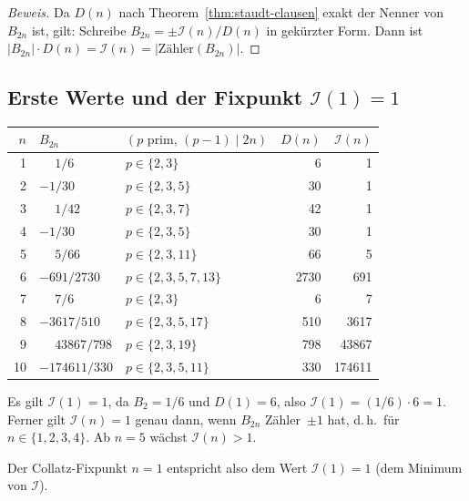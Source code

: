 \documentclass[12pt,a4paper]{article}
\newenvironment{beweis}{\begin{proof}[Beweis]}{\end{proof}}
\newcommand{\abs}[1]{\lvert#1\rvert}
\newcommand{\In}{\mathcal{I}}      %
\newcommand{\Denom}[1]{D(#1)}     %
\begin{document}
\begin{beweis}
Da $\Denom{n}$ nach Theorem~\ref{thm:staudt-clausen} exakt der Nenner von
$B_{2n}$ ist, gilt: Schreibe $B_{2n} = \pm \In(n)/\Denom{n}$ in gekürzter Form.
Dann ist $\abs{B_{2n}} \cdot \Denom{n} = \In(n) = \abs{\text{Zähler}(B_{2n})}$.
\end{beweis}

\subsection{Erste Werte und der Fixpunkt \texorpdfstring{$\In(1) = 1$}{I(1)=1}}

\begin{center}
\renewcommand{\arraystretch}{1.3}
\begin{tabular}{rllrr}
\toprule
$n$ & $B_{2n}$ & $(p\text{ prim, }(p{-}1)\mid 2n)$ & $\Denom{n}$ & $\In(n)$ \\
\midrule
1 & $\phantom{-}1/6$    & $p \in \{2,3\}$     & 6    & 1 \\
2 & $-1/30$             & $p \in \{2,3,5\}$   & 30   & 1 \\
3 & $\phantom{-}1/42$   & $p \in \{2,3,7\}$   & 42   & 1 \\
4 & $-1/30$             & $p \in \{2,3,5\}$   & 30   & 1 \\
5 & $\phantom{-}5/66$   & $p \in \{2,3,11\}$  & 66   & 5 \\
6 & $-691/2730$         & $p \in \{2,3,5,7,13\}$ & 2730 & 691 \\
7 & $\phantom{-}7/6$    & $p \in \{2,3\}$     & 6    & 7 \\
8 & $-3617/510$         & $p \in \{2,3,5,17\}$ & 510 & 3617 \\
9 & $\phantom{-}43867/798$ & $p\in\{2,3,19\}$ & 798 & 43867 \\
10 & $-174611/330$      & $p\in\{2,3,5,11\}$ & 330 & 174611 \\
\bottomrule
\end{tabular}
\end{center}

\begin{tcolorbox}[bernoulli, title={Schlüsseleigenschaft: Fixpunkt $\In(1) = 1$}]
Es gilt $\In(1) = 1$, da $B_2 = 1/6$ und $\Denom{1} = 6$, also
$\In(1) = (1/6)\cdot 6 = 1$.
Ferner gilt $\In(n) = 1$ genau dann, wenn $B_{2n}$ Zähler~$\pm 1$ hat,
d.\,h.\ für $n \in \{1, 2, 3, 4\}$. Ab $n = 5$ wächst $\In(n) > 1$.

Der Collatz-Fixpunkt $n = 1$ entspricht also dem Wert $\In(1) = 1$
(dem Minimum von $\In$).
\end{tcolorbox}
\end{document}
